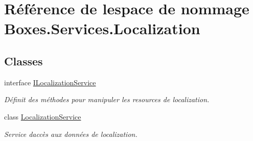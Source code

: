 \hypertarget{namespace_boxes_1_1_services_1_1_localization}{}\section{Référence de l\textquotesingle{}espace de nommage Boxes.\+Services.\+Localization}
\label{namespace_boxes_1_1_services_1_1_localization}
\subsection*{Classes}
\begin{DoxyCompactItemize}
\item 
interface \hyperlink{interface_boxes_1_1_services_1_1_localization_1_1_i_localization_service}{I\+Localization\+Service}
\begin{DoxyCompactList}\small\item\em Définit des méthodes pour manipuler les resources de localization. \end{DoxyCompactList}\item 
class \hyperlink{class_boxes_1_1_services_1_1_localization_1_1_localization_service}{Localization\+Service}
\begin{DoxyCompactList}\small\item\em Service d\textquotesingle{}accès aux données de localization. \end{DoxyCompactList}\end{DoxyCompactItemize}
